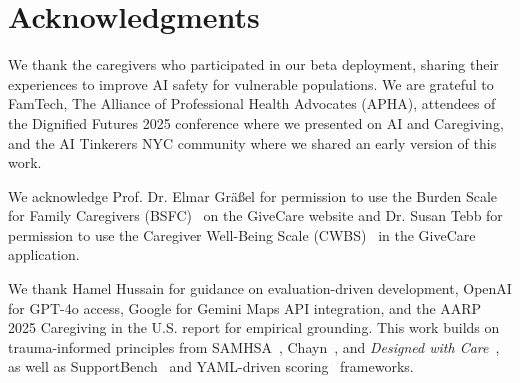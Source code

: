 \documentclass{article}
\begin{document}
\section{Acknowledgments}%
\label{sec:Acknowledgments}%
We thank the caregivers who participated in our beta deployment, sharing their experiences to improve AI safety for vulnerable populations. We are grateful to FamTech, The Alliance of Professional Health Advocates (APHA), attendees of the Dignified Futures 2025 conference where we presented on AI and Caregiving, and the AI Tinkerers NYC community where we shared an early version of this work.

We acknowledge Prof. Dr. Elmar Gr\"a\ss el for permission to use the Burden Scale for Family Caregivers (BSFC)~\cite{graessel2014} on the GiveCare website and Dr. Susan Tebb for permission to use the Caregiver Well-Being Scale (CWBS)~\cite{tebb1995,tebb2013} in the GiveCare application.

We thank Hamel Hussain for guidance on evaluation-driven development, OpenAI for GPT-4o access, Google for Gemini Maps API integration, and the AARP 2025 Caregiving in the U.S. report for empirical grounding. This work builds on trauma-informed principles from SAMHSA~\cite{samhsa2014}, Chayn~\cite{chayn2024}, and \textit{Designed with Care}~\cite{edwards2024}, as well as SupportBench~\cite{longitudinalbench} and YAML-driven scoring~\cite{yaml-scoring} frameworks.

%
\end{document}
